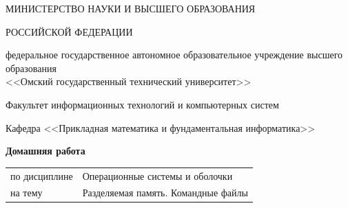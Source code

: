 \documentclass[a4paper,12pt]{article}
\begin{document}
\thispagestyle{empty} %

\begin{center}
МИНИСТЕРСТВО НАУКИ И ВЫСШЕГО ОБРАЗОВАНИЯ

РОССИЙСКОЙ ФЕДЕРАЦИИ

федеральное государственное автономное образовательное учреждение высшего образования\\
<<Омский государственный технический университет>>

\vspace*{10mm}
Факультет информационных технологий и компьютерных систем

Кафедра <<Прикладная математика и фундаментальная информатика>>

\vspace*{20mm}

\textbf{\Large Домашняя работа}

\vspace*{20mm}
\begin{tabular}{ll}
по дисциплине	& Операционные системы и оболочки\\
на тему	      & Разделяемая память. Командные файлы
\end{tabular}


\end{center}
\end{document}
